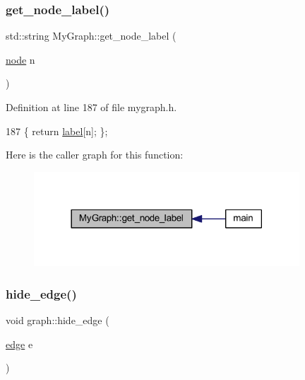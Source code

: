 \subsubsection{\texorpdfstring{get\+\_\+node\+\_\+label()}{get\_node\_label()}}
{\footnotesize\ttfamily std\+::string My\+Graph\+::get\+\_\+node\+\_\+label (\begin{DoxyParamCaption}\item[{\mbox{\hyperlink{classnode}{node}}}]{n }\end{DoxyParamCaption})\hspace{0.3cm}{\ttfamily [inline]}}



Definition at line 187 of file mygraph.\+h.


\begin{DoxyCode}
187 \{ \textcolor{keywordflow}{return} \mbox{\hyperlink{class_my_graph_a5c9923e2b43cb5a3139715acc34b8ca8}{label}}[n]; \};
\end{DoxyCode}
Here is the caller graph for this function\+:
\nopagebreak
\begin{figure}[H]
\begin{center}
\leavevmode
\includegraphics[width=282pt]{class_my_graph_ab92ebd7632157e681a6a7d7873841de7_icgraph}
\end{center}
\end{figure}
\mbox{\label{classgraph_ab2f8520bcac080d73c55228fecc61825}} 
\subsubsection{\texorpdfstring{hide\+\_\+edge()}{hide\_edge()}}
{\footnotesize\ttfamily void graph\+::hide\+\_\+edge (\begin{DoxyParamCaption}\item[{\mbox{\hyperlink{classedge}{edge}}}]{e }\end{DoxyParamCaption})\hspace{0.3cm}{\ttfamily [inherited]}}

